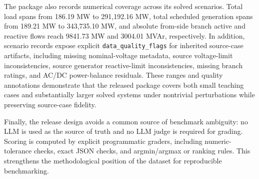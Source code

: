 The package also records numerical coverage across its solved scenarios. Total load spans from 186.19 MW to 291{,}192.16 MW, total scheduled generation spans from 189.21 MW to 343{,}735.10 MW, and absolute from-side branch active and reactive flows reach 9841.73 MW and 3004.01 MVAr, respectively. In addition, scenario records expose explicit \texttt{data\_quality\_flags} for inherited source-case artifacts, including missing nominal-voltage metadata, source voltage-limit inconsistencies, source generator reactive-limit inconsistencies, missing branch ratings, and AC/DC power-balance residuals. These ranges and quality annotations demonstrate that the released package covers both small teaching cases and substantially larger solved systems under nontrivial perturbations while preserving source-case fidelity.

Finally, the release design avoids a common source of benchmark ambiguity: no LLM is used as the source of truth and no LLM judge is required for grading. Scoring is computed by explicit programmatic graders, including numeric-tolerance checks, exact JSON checks, and argmin/argmax or ranking rules. This strengthens the methodological position of the dataset for reproducible benchmarking.

\begin{table}[!t]
\caption{Release validation summary for \textit{pfbench v\datasetversion}.}
\label{tab:validation}
\centering
{}
\end{table}

